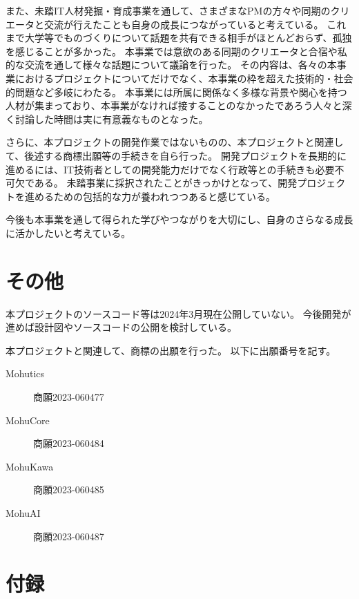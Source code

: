 \documentclass[uplatex,a4paper,12pt]{jsarticle}
\begin{document}
また、未踏IT人材発掘・育成事業を通して、さまざまなPMの方々や同期のクリエータと交流が行えたことも自身の成長につながっていると考えている。
これまで大学等でものづくりについて話題を共有できる相手がほとんどおらず、孤独を感じることが多かった。
本事業では意欲のある同期のクリエータと合宿や私的な交流を通して様々な話題について議論を行った。
その内容は、各々の本事業におけるプロジェクトについてだけでなく、本事業の枠を超えた技術的・社会的問題など多岐にわたる。
本事業には所属に関係なく多様な背景や関心を持つ人材が集まっており、本事業がなければ接することのなかったであろう人々と深く討論した時間は実に有意義なものとなった。

さらに、本プロジェクトの開発作業ではないものの、本プロジェクトと関連して、後述する商標出願等の手続きを自ら行った。
開発プロジェクトを長期的に進めるには、IT技術者としての開発能力だけでなく行政等との手続きも必要不可欠である。
未踏事業に採択されたことがきっかけとなって、開発プロジェクトを進めるための包括的な力が養われつつあると感じている。

今後も本事業を通して得られた学びやつながりを大切にし、自身のさらなる成長に活かしたいと考えている。


\section{その他}
本プロジェクトのソースコード等は2024年3月現在公開していない。
今後開発が進めば設計図やソースコードの公開を検討している。

本プロジェクトと関連して、商標の出願を行った。
以下に出願番号を記す。
\begin{description}
  \item[Mohutics] 商願2023-060477
  \item[MohuCore] 商願2023-060484
  \item[MohuKawa] 商願2023-060485
  \item[MohuAI] 商願2023-060487
\end{description}

\section{付録}
\end{document}
